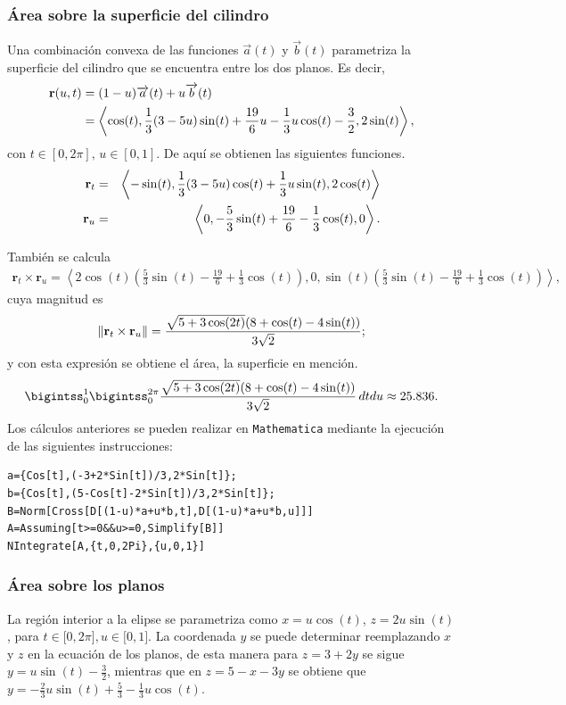 \subsubsection{Área sobre la superficie del cilindro}
Una combinación convexa de las funciones
$\overrightarrow{a}(t)$ y $\overrightarrow{b}(t)$ parametriza la superficie del cilindro que se encuentra entre los dos planos. Es decir,
\begin{align*}
{\bf r}(u,t) &= ( 1-u) \overrightarrow{a}(t)+u\overrightarrow{b}(t) \\
&= \left \langle \cos (t),\frac{1}{3}( 3-5u)\sin (t) +\frac{19}{6}u-\frac{1}{3}u\cos (t)-\frac{3}{2},2\sin (t)\right \rangle,
\end{align*}
con $t\in [0,2\pi],\,u\in [0,1]$.
De aquí se obtienen las siguientes funciones.
\begin{eqnarray*}
{\bf r}_{t}&=& \left \langle -\sin(t),\frac{1}{3}(3-5u)\cos(t)+\frac{1}{3}u\sin(t),2\cos(t)\right \rangle \\
{\bf r}_{u}&=& \left \langle 0,-\frac{5}{3}\sin(t)+\frac{19}{6}-\frac{1}{3}\cos(t),0\right \rangle.
\end{eqnarray*}

También se calcula
\begin{gather*}
\mathbf{r}_{t}\times\mathbf{r}_{u}= \left \langle2\cos(t)\left (\frac{5}{3}\sin(t)-\frac{19}{6}+\frac{1}{3}\cos(t)\right),0,\sin(t)\left (\frac{5}{3}\sin(t)-\frac{19}{6}+\frac{1}{3}\cos(t)\right) \right \rangle,
\end{gather*}
cuya magnitud es
\[\|{\bf r}_{t}\times{\bf r}_{u}\|=\frac{\sqrt{5+3\cos(2t)}(8+\cos(t)-4\sin (t))}{3\sqrt{2}};\]
y con esta expresión se obtiene el área, la superficie en mención.
\[\bigintss_{0}^{1}\bigintss_{0}^{2\pi}\frac{\sqrt{5+3\cos(2t)}(8+\cos(t)-4\sin(t))}{3\sqrt{2}} \, dtdu \approx 25.836.\]
Los cálculos anteriores se pueden realizar en \verb"Mathematica"
mediante la ejecución de las siguientes instrucciones:

\begin{tcolorbox}[title=\bf Instrucción en \verb"Mathematica"]
\begin{Verbatim}[formatcom=\letraverbatim]
a={Cos[t],(-3+2*Sin[t])/3,2*Sin[t]};
b={Cos[t],(5-Cos[t]-2*Sin[t])/3,2*Sin[t]};
B=Norm[Cross[D[(1-u)*a+u*b,t],D[(1-u)*a+u*b,u]]]
A=Assuming[t>=0&&u>=0,Simplify[B]]
NIntegrate[A,{t,0,2Pi},{u,0,1}]
\end{Verbatim}
\end{tcolorbox}

\subsubsection{Área sobre los planos}
La región interior a la elipse se parametriza como
$x=u\cos(t)$, $z=2u\sin (t)$, para $t\in \lbrack 0,2\pi ],u\in \lbrack 0,1]$.
La coordenada $y$ se puede determinar reemplazando $x$ y $z$ en la ecuación de los planos, de esta manera para  $z=3+2y$ se sigue $y=u\sin (t)-\frac{3}{2}$,
mientras que en $z=5-x-3y$ se obtiene que
$y=-\frac{2}{3}u\sin (t)+\frac{5}{3}-\frac{1}{3}u\cos (t)$.

